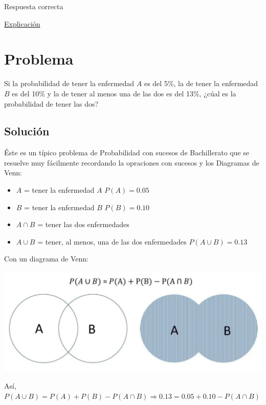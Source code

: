 \documentclass[
]{book}
\providecommand{\tightlist}{%
  \setlength{\itemsep}{0pt}\setlength{\parskip}{0pt}}
\begin{document}
Respuesta correcta

\href{https://1fjmanzano.github.io/bioestadistica/relaci\%C3\%B3n-entre-variables-cualitativas.html\#diagno\%CC\%81stico-cli\%CC\%81nico}{Explicación}

\hypertarget{problema-10}{%
\section{Problema}\label{problema-10}}

Si la probabilidad de tener la enfermedad \(A\) es del 5\%, la de tener la enfermedad \(B\) es del 10\% y la de tener al menos una de las dos es del 13\%, ¿cúal es la probabilidad de tener las dos?

\hypertarget{soluciuxf3n-8}{%
\subsection{Solución}\label{soluciuxf3n-8}}

Éste es un típico problema de Probabilidad con sucesos de Bachillerato que se resuelve muy fácilmente recordando la opraciones con sucesos y los Diagramas de Venn:

\begin{itemize}
\tightlist
\item
  \(A\) = tener la enfermedad \(A\) \(P(A)=0.05\)
\item
  \(B\) = tener la enfermedad \(B\) \(P(B)=0.10\)
\item
  \(A \cap B\) = tener las dos enfermedades
\item
  \(A \cup B\) = tener, al menos, una de las dos enfermedades \(P(A \cup B) = 0.13\)
\end{itemize}

Con un diagrama de Venn:

\includegraphics[width=16.03in]{img/7_1}

Así, \(P(A \cup B)=P(A)+P(B)-P(A \cap B) \Rightarrow 0.13=0.05 + 0.10 - P(A \cap B)\)
\end{document}
